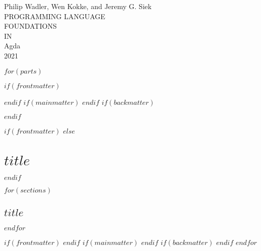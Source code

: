 \documentclass[10pt]{book}
\begin{document}
\setlength{\mathindent}{0pt}
\setlength{\parindent}{0em}
\setlength{\parskip}{1em}

\providecommand{\tightlist}{%
  \setlength{\itemsep}{0pt}\setlength{\parskip}{0pt}}

\begin{titlepage}
  \newlength{\drop}%
  \setlength{\drop}{0.12\textheight}%
  \centering%
  \vspace*{\drop}
  \begingroup%
  {\large Philip Wadler, Wen Kokke, and Jeremy G. Siek}\\[\baselineskip]
  {\Huge PROGRAMMING LANGUAGE}\\[\baselineskip]
  {\Huge FOUNDATIONS}\\[\baselineskip]
  {\Large IN}\\[\baselineskip]
  {\Huge Agda}\\[\drop]
  \vfill%
  {\small\scshape 2021}\par%
  \null\endgroup
\end{titlepage}

$for(parts)$

$if(frontmatter)$
\frontmatter%
\setcounter{tocdepth}{0}

\tableofcontents%
\setcounter{tocdepth}{1}
$endif$
$if(mainmatter)$
\mainmatter%
$endif$
$if(backmatter)$
\appendix
{}
$endif$

$if(frontmatter)$
$else$
\part{$title$}
$endif$

$for(sections)$
\hypertarget{$anchor$}{%
  \chapter{$title$}\label{$anchor$}}

$endfor$

$if(frontmatter)$
$endif$
$if(mainmatter)$
\cleardoublepage%
%
$endif$
$if(backmatter)$
$endif$
$endfor$
\end{document}
